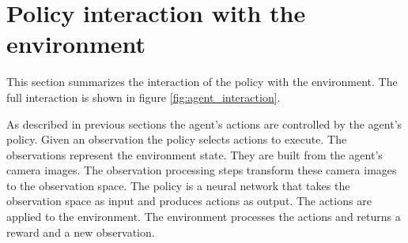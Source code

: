
\section{Policy interaction with the environment}

This section summarizes the interaction of the policy with the environment. The full interaction is shown in figure \ref{fig:agent_interaction}.

As described in previous sections the agent's actions are controlled by the agent's policy. Given an observation the policy selects actions to execute. The observations represent the environment state. They are built from the agent's camera images. The observation processing steps transform these camera images to the observation space. The policy is a neural network that takes the observation space as input and produces actions as output. 
The actions are applied to the environment. The environment processes the actions and returns a reward and a new observation.



\newcommand{\preprocessedImg}[1]{\texttt{[image: Bilder/image\_printer\_images/agent\_interaction/step\_\#1.png]}}
\newcommand{\observationStack}{\texttt{[image: Bilder/observation\_stack.png]}}


\newcommand\yOffsetHalf{-4}
\newcommand\yOffset{-8}

\newcommand\xOffset{0.5}


